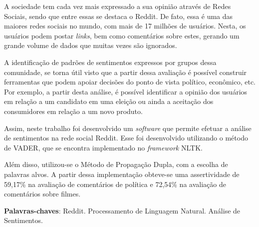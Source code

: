 \setlength{\absparsep}{18pt} %
\begin{resumo}
A sociedade tem cada vez mais expressado a sua opinião através de Redes
Sociais, sendo que entre essas se destaca o
Reddit. De fato, essa é uma das maiores redes sociais no mundo, com mais de 17
milhões de usuários. Nesta, os usuários podem postar \textit{links}, bem como
comentários sobre estes, gerando um grande volume de dados que muitas vezes são
ignorados.

A identificação de padrões de sentimentos expressos por grupos dessa comunidade,
se torna útil visto que a partir dessa avaliação é possível construir
ferramentas que podem apoiar decisões do ponto de vista político, econômico, etc. Por exemplo, a partir desta análise, é
possível identificar a opinião dos usuários em relação a um candidato em uma eleição ou ainda a aceitação dos
consumidores em relação a um novo produto.

Assim, neste trabalho foi desenvolvido um \textit{software} que permite efetuar
a análise de sentimentos na rede social Reddit. Esse foi desenvolvido
utilizando o método de \ac{VADER}, que se encontra implementado no
\textit{framework} \ac{NLTK}.

Além disso, utilizou-se o Método de Propagação Dupla, com a escolha de palavras
alvos. A partir dessa implementação obteve-se uma assertividade de 59,17\% na
avaliação de comentários de política e 72,54\% na avaliação de comentários sobre
filmes.


 \textbf{Palavras-chaves}: Reddit. Processamento de Linguagem Natural. Análise de Sentimentos.
\end{resumo}

